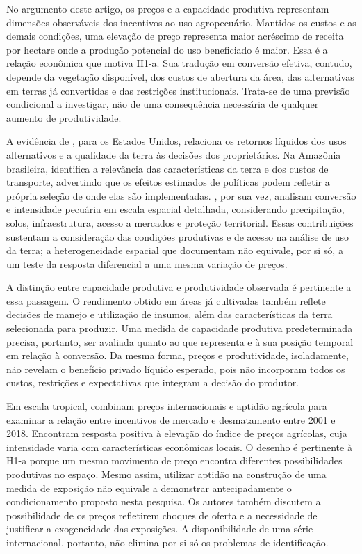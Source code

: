 No argumento deste artigo, os preços e a capacidade produtiva representam dimensões observáveis dos incentivos ao uso agropecuário. Mantidos os custos e as demais condições, uma elevação de preço representa maior acréscimo de receita por hectare onde a produção potencial do uso beneficiado é maior. Essa é a relação econômica que motiva H1-a. Sua tradução em conversão efetiva, contudo, depende da vegetação disponível, dos custos de abertura da área, das alternativas em terras já convertidas e das restrições institucionais. Trata-se de uma previsão condicional a investigar, não de uma consequência necessária de qualquer aumento de produtividade.

A evidência de , para os Estados Unidos, relaciona os retornos líquidos dos usos alternativos e a qualidade da terra às decisões dos proprietários. Na Amazônia brasileira,  identifica a relevância das características da terra e dos custos de transporte, advertindo que os efeitos estimados de políticas podem refletir a própria seleção de onde elas são implementadas. , por sua vez, analisam conversão e intensidade pecuária em escala espacial detalhada, considerando precipitação, solos, infraestrutura, acesso a mercados e proteção territorial. Essas contribuições sustentam a consideração das condições produtivas e de acesso na análise de uso da terra; a heterogeneidade espacial que documentam não equivale, por si só, a um teste da resposta diferencial a uma mesma variação de preços.

A distinção entre capacidade produtiva e produtividade observada é pertinente a essa passagem. O rendimento obtido em áreas já cultivadas também reflete decisões de manejo e utilização de insumos, além das características da terra selecionada para produzir. Uma medida de capacidade produtiva predeterminada precisa, portanto, ser avaliada quanto ao que representa e à sua posição temporal em relação à conversão. Da mesma forma, preços e produtividade, isoladamente, não revelam o benefício privado líquido esperado, pois não incorporam todos os custos, restrições e expectativas que integram a decisão do produtor.

Em escala tropical,  combinam preços internacionais e aptidão agrícola para examinar a relação entre incentivos de mercado e desmatamento entre 2001 e 2018. Encontram resposta positiva à elevação do índice de preços agrícolas, cuja intensidade varia com características econômicas locais. O desenho é pertinente à H1-a porque um mesmo movimento de preço encontra diferentes possibilidades produtivas no espaço. Mesmo assim, utilizar aptidão na construção de uma medida de exposição não equivale a demonstrar antecipadamente o condicionamento proposto nesta pesquisa. Os autores também discutem a possibilidade de os preços refletirem choques de oferta e a necessidade de justificar a exogeneidade das exposições. A disponibilidade de uma série internacional, portanto, não elimina por si só os problemas de identificação.

